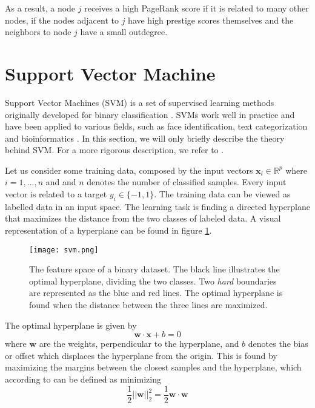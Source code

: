 As a result, a node $j$ receives a high PageRank score if it is related to many other nodes, if the nodes adjacent to $j$ have high prestige scores themselves and the neighbors to node $j$ have a small outdegree. 


\section{Support Vector Machine \label{svmTheory}}
Support Vector Machines (SVM) is a set of supervised learning methods originally developed for binary classification \citep{Hsu2002}. SVMs work well in practice and have been applied to various fields, such as face identification, text categorization and bioinformatics \citep{campbell2011}. In this section, we will only briefly describe the theory behind SVM. For a more rigorous description, we refer to \citep{Kecman2005,Cortes1995,campbell2011}.

Let us consider some training data, composed by the input vectors $\bm{x}_i\in \mathds{R}^p$ where $i=1,...,n$ and and $n$ denotes the number of classified samples. Every input vector is related to a target $y_i \in \{-1,1\}$. The training data can be viewed as labelled data in an input space. The learning task is finding a directed hyperplane that maximizes the distance from the two classes of labeled data. A visual representation of a hyperplane can be found in figure \ref{svm}. 

\begin{figure}[h!]
    \centering
    \texttt{[image: svm.png]}
    \caption{The feature space of a binary dataset. The black line illustrates the optimal hyperplane, dividing the two classes. Two \textit{hard} boundaries are represented as the blue and red lines. The optimal hyperplane is found when the distance between the three lines are maximized.}
    \label{svm}
\end{figure}

The optimal hyperplane is given by \citep{campbell2011}
\begin{equation}
    \bm{w}\cdot\bm{x}+b=0
\end{equation}
where $\bm{w}$ are the weights, perpendicular to the hyperplane, and $b$ denotes the bias or offset which displaces the hyperplane from the origin. This is found by maximizing the margins between the closest samples and the hyperplane, which according to \citet{campbell2011} can be defined as minimizing $$\frac{1}{2}||\bm{w}||_2^2=\frac{1}{2}\bm{w}\cdot\bm{w}$$

